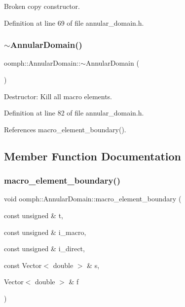 Broken copy constructor. 



Definition at line 69 of file annular\+\_\+domain.\+h.

\mbox{\label{classoomph_1_1AnnularDomain_a99ee51c9e5fd12fdd123ede8da09c483}} 
\subsubsection{\texorpdfstring{$\sim$\+Annular\+Domain()}{~AnnularDomain()}}
{\footnotesize\ttfamily oomph\+::\+Annular\+Domain\+::$\sim$\+Annular\+Domain (\begin{DoxyParamCaption}{ }\end{DoxyParamCaption})\hspace{0.3cm}{\ttfamily [inline]}}



Destructor\+: Kill all macro elements. 



Definition at line 82 of file annular\+\_\+domain.\+h.



References macro\+\_\+element\+\_\+boundary().



\subsection{Member Function Documentation}
\mbox{\label{classoomph_1_1AnnularDomain_ade8cfa0e6f2d41e7d3877250321bfff3}} 
\subsubsection{\texorpdfstring{macro\+\_\+element\+\_\+boundary()}{macro\_element\_boundary()}}
{\footnotesize\ttfamily void oomph\+::\+Annular\+Domain\+::macro\+\_\+element\+\_\+boundary (\begin{DoxyParamCaption}\item[{const unsigned \&}]{t,  }\item[{const unsigned \&}]{i\+\_\+macro,  }\item[{const unsigned \&}]{i\+\_\+direct,  }\item[{const Vector$<$ double $>$ \&}]{s,  }\item[{Vector$<$ double $>$ \&}]{f }\end{DoxyParamCaption})}



